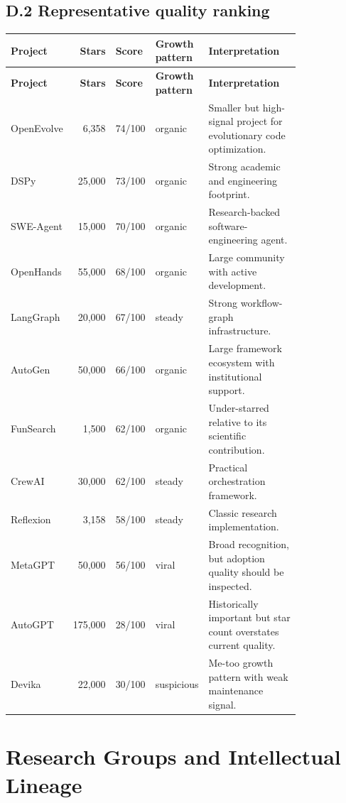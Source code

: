 \subsection*{D.2 Representative quality ranking}

{\TableTight
\begin{longtable}{@{}L{0.18\linewidth}r L{0.12\linewidth}L{0.17\linewidth}L{0.34\linewidth}@{}}
\toprule
\textbf{Project} & \textbf{Stars} & \textbf{Score} & \textbf{Growth pattern} & \textbf{Interpretation} \\
\midrule
\endfirsthead
\toprule
\textbf{Project} & \textbf{Stars} & \textbf{Score} & \textbf{Growth pattern} & \textbf{Interpretation} \\
\midrule
\endhead
\bottomrule
\endlastfoot
OpenEvolve & 6,358 & 74/100 & organic & Smaller but high-signal project for evolutionary code optimization. \\
DSPy & 25,000 & 73/100 & organic & Strong academic and engineering footprint. \\
SWE-Agent & 15,000 & 70/100 & organic & Research-backed software-engineering agent. \\
OpenHands & 55,000 & 68/100 & organic & Large community with active development. \\
LangGraph & 20,000 & 67/100 & steady & Strong workflow-graph infrastructure. \\
AutoGen & 50,000 & 66/100 & organic & Large framework ecosystem with institutional support. \\
FunSearch & 1,500 & 62/100 & organic & Under-starred relative to its scientific contribution. \\
CrewAI & 30,000 & 62/100 & steady & Practical orchestration framework. \\
Reflexion & 3,158 & 58/100 & steady & Classic research implementation. \\
MetaGPT & 50,000 & 56/100 & viral & Broad recognition, but adoption quality should be inspected. \\
AutoGPT & 175,000 & 28/100 & viral & Historically important but star count overstates current quality. \\
Devika & 22,000 & 30/100 & suspicious & Me-too growth pattern with weak maintenance signal. \\
\end{longtable}}

\section{Research Groups and Intellectual Lineage}
\label{app:researchers}

